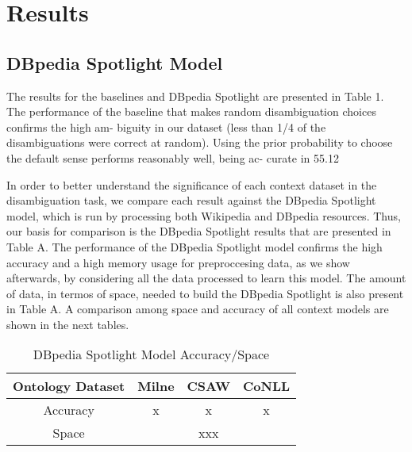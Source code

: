 \documentclass[10pt,a4paper]{article}
\begin{document}

\section{Results}

\subsection{DBpedia Spotlight Model}

The results for the baselines and DBpedia Spotlight are presented in Table 1. The performance of the baseline that makes random disambiguation choices confirms the high am- biguity in our dataset (less than 1/4 of the disambiguations were correct at random). Using the prior probability to choose the default sense performs reasonably well, being ac- curate in 55.12%

In order to better understand the significance of each context dataset in the disambiguation task, we compare each result against the DBpedia Spotlight model, which is run by processing both Wikipedia and DBpedia resources. Thus, our basis for comparison is the DBpedia Spotlight results that are presented in Table A. The performance of the DBpedia Spotlight model confirms the high accuracy and a high memory usage for preproccesing data, as we show afterwards, by considering all the data processed to learn this model. The amount of data, in termos of space, needed to build the DBpedia Spotlight is also present in Table A. A comparison among space and accuracy of all context models are shown in the next tables.

\begin{table}[ht] 
\caption{DBpedia Spotlight Model Accuracy/Space}
\centering
\begin{tabular}{c c c c}
\hline\hline 
Ontology Dataset	& Milne 	& CSAW 	& CoNLL \\ [0.5ex] 
\hline 
Accuracy 			& x			& x 	& x 	\\ 
Space 				& 	 		& xxx 	& 	 	\\ [1ex] 
\hline
\end{tabular} 
\label{table:nonlin} 
\end{table} 
\end{document}
